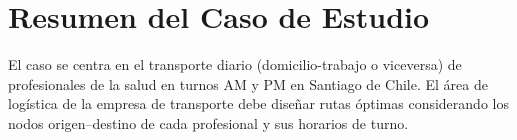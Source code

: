 \section{Resumen del Caso de Estudio}

El caso se centra en el transporte diario (domicilio-trabajo o viceversa) de profesionales de la salud en turnos AM y PM en Santiago de Chile. El área de logística de la empresa de transporte debe diseñar rutas óptimas considerando los nodos origen--destino de cada profesional y sus horarios de turno.
























